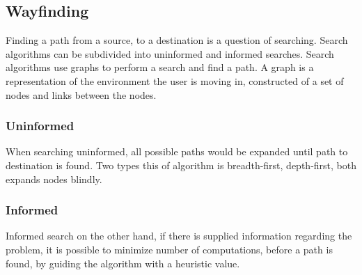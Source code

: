 
\subsection{Wayfinding}\label{sub:way}


Finding a path from a source, to a destination is a question of searching. Search algorithms can be subdivided into uninformed and informed searches. Search algorithms use graphs to perform a search and find a path. A graph is a representation of the environment the user is moving in, constructed of a set of nodes and links between the nodes. 

\subsubsection{Uninformed}

When searching uninformed, all possible paths would be expanded until path to destination is found. Two types this of algorithm is breadth-first, depth-first, both expands nodes blindly. 

\subsubsection{Informed}

Informed search on the other hand, if there is supplied information regarding the problem, it is possible to minimize number of computations, before a path is found, by guiding the algorithm with a heuristic value.